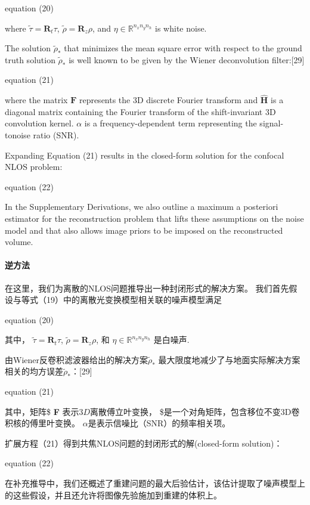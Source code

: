 \documentclass[11pt]{article}
\begin{document}
 equation (20)

where \(\tilde{\tau}=\textbf{R}_{t} \tau\),
\(\tilde{\rho}=\textbf{R}_{z} \rho\), and
\(\eta \in \mathbb{R}^{n_{x}n_{y}n_{h}}\) is white noise.

The solution \(\tilde{\rho}_{*}\) that minimizes the mean square error
with respect to the ground truth solution \(\tilde{\rho}_{*}\) is well
known to be given by the Wiener deconvolution filter:{[}29{]}

 equation (21)

where the matrix \(\textbf{F}\) represents the 3D discrete Fourier
transform and \(\hat{\textbf{H}}\) is a diagonal matrix containing the
Fourier transform of the shift-invariant 3D convolution kernel.
\(\alpha\) is a frequency-dependent term representing the signal-tonoise
ratio (SNR).

Expanding Equation (21) results in the closed-form solution for the
confocal NLOS problem:

 equation (22)

In the Supplementary Derivations, we also outline a maximum a posteriori
estimator for the reconstruction problem that lifts these assumptions on
the noise model and that also allows image priors to be imposed on the
reconstructed volume. 

    \paragraph{逆方法}\label{ux9006ux65b9ux6cd5}

在这里，我们为离散的NLOS问题推导出一种封闭形式的解决方案。
我们首先假设与等式（19）中的离散光变换模型相关联的噪声模型满足

 equation (20)

其中， \(\tilde{\tau}=\textbf{R}_{t} \tau\),
\(\tilde{\rho}=\textbf{R}_{z} \rho\), 和
\(\eta \in \mathbb{R}^{n_{x}n_{y}n_{h}}\) 是白噪声.

由Wiener反卷积滤波器给出的解决方案\(\tilde{\rho}_{*}\)
最大限度地减少了与地面实际解决方案相关的均方误差\(\tilde{\rho}_{*}\)：{[}29{]}

 equation (21)

其中，矩阵\$ \textbf {F} \(表示3D离散傅立叶变换，\) 
\$是一个对角矩阵，包含移位不变3D卷积核的傅里叶变换。
\(\alpha\)是表示信噪比（SNR）的频率相关项。

扩展方程（21）得到共焦NLOS问题的封闭形式的解(closed-form solution)：

 equation (22)

在补充推导中，我们还概述了重建问题的最大后验估计，该估计提取了噪声模型上的这些假设，并且还允许将图像先验施加到重建的体积上。
\end{document}
